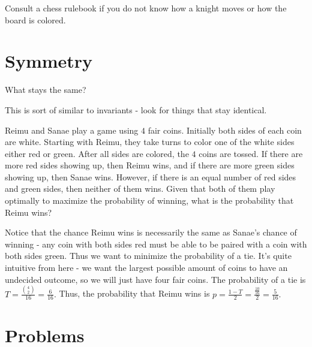 \documentclass[blue,onecol]{shooting}
\begin{document}
Consult a chess rulebook if you do not know how a knight moves or how the board is colored.

\section{Symmetry}
What stays the same?

This is sort of similar to invariants - look for things that stay identical.

\begin{exam}[HMMT 2019]
Reimu and Sanae play a game using $4$ fair coins. Initially both sides of each coin are white. Starting with Reimu, they take turns to color one of the white sides either red or green. After all sides are colored, the $4$ coins are tossed. If there are more red sides showing up, then Reimu wins, and if there are more green sides showing up, then Sanae wins. However, if there is an equal number of red sides and green sides, then neither of them wins. Given that both of them play optimally to maximize the probability of winning, what is the probability that Reimu wins?
\end{exam}

\begin{sol}Notice that the chance Reimu wins is necessarily the same as Sanae's chance of winning - any coin with both sides red must be able to be paired with a coin with both sides green. Thus we want to minimize the probability of a tie. It's quite intuitive from here - we want the largest possible amount of coins to have an undecided outcome, so we will just have four fair coins. The probability of a tie is $T=\frac{\binom{4}{2}}{16}=\frac{6}{16}.$ Thus, the probability that Reimu wins is $p=\frac{1-T}{2}=\frac{\frac{10}{16}}{2}=\frac{5}{16}.$\end{sol}













\pagebreak

\section{Problems}
\end{document}
